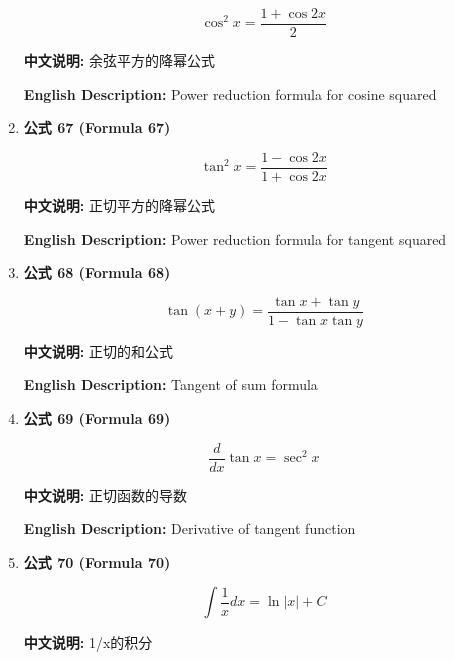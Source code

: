 \documentclass[12pt,a4paper]{article}
\begin{document}
\begin{enumerate}[leftmargin=*]
\begin{equation}
\cos^2 x = \frac{1 + \cos 2x}{2}
\end{equation}

\textbf{中文说明:} 余弦平方的降幂公式

\textbf{English Description:} Power reduction formula for cosine squared

\vspace{0.5cm}

\item \textbf{公式 67 (Formula 67)}

\begin{equation}
\tan^2 x = \frac{1 - \cos 2x}{1 + \cos 2x}
\end{equation}

\textbf{中文说明:} 正切平方的降幂公式

\textbf{English Description:} Power reduction formula for tangent squared

\vspace{0.5cm}

\item \textbf{公式 68 (Formula 68)}

\begin{equation}
\tan(x+y) = \frac{\tan x + \tan y}{1 - \tan x \tan y}
\end{equation}

\textbf{中文说明:} 正切的和公式

\textbf{English Description:} Tangent of sum formula

\vspace{0.5cm}

\item \textbf{公式 69 (Formula 69)}

\begin{equation}
\frac{d}{dx}\tan x = \sec^2 x
\end{equation}

\textbf{中文说明:} 正切函数的导数

\textbf{English Description:} Derivative of tangent function

\vspace{0.5cm}

\item \textbf{公式 70 (Formula 70)}

\begin{equation}
\int \frac{1}{x} dx = \ln|x| + C
\end{equation}

\textbf{中文说明:} 1/x的积分


\end{enumerate}
\end{document}
